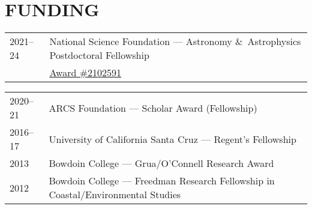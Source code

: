 \section*{FUNDING}
\begin{tabular}{@{}p{.1\linewidth} @{}p{.9\linewidth}} 
2021--24 & National Science Foundation --- Astronomy \&\ Astrophysics Postdoctoral Fellowship\\
& \href{https://www.nsf.gov/awardsearch/showAward?AWD_ID=2102591}{Award \#2102591}
\end{tabular}

\begin{tabular}{@{}p{.1\linewidth} @{}p{.9\linewidth}} 
    2020--21 & ARCS Foundation --- Scholar Award (Fellowship) \\
2016--17 & University of California Santa Cruz  --- Regent's Fellowship \\
2013 & Bowdoin College --- Grua/O'Connell Research Award  \\ 
2012 & Bowdoin College --- Freedman Research Fellowship in Coastal/Environmental Studies \\
\end{tabular}